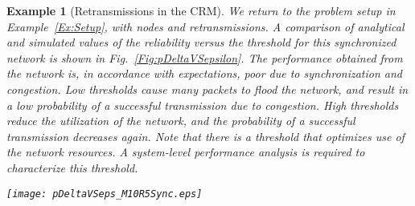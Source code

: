 \documentclass[journal]{IEEEtran}
\newtheorem{example}{Example}[section]
\begin{document}
\begin{example}[Retransmissions in the CRM] \label{Ex:Retx}
We return to the problem setup in Example~\ref{Ex:Setup}, with  nodes and  retransmissions. A comparison of analytical and simulated values of the reliability versus the threshold for this synchronized network is shown in Fig.~\ref{Fig:pDeltaVSepsilon}. The performance obtained from the network is, in accordance with expectations, poor due to synchronization and congestion. Low thresholds cause many packets to flood the network, and result in a low probability of a successful transmission due to congestion. High thresholds reduce the utilization of the network, and the probability of a successful transmission decreases again. Note that there is a threshold that optimizes use of the network resources. A system-level performance analysis is required to characterize this threshold.

\begin{figure*}[tb]
\begin{center}
\texttt{[image: pDeltaVSeps\_M10R5Sync.eps]}
\caption{A comparison of the analytical and simulated values of the reliability versus the scheduler threshold, with retransmissions in the CRM. This example validates Assumption~\ref{Assumption:BianchiMulti}. Note that low thresholds result in a low  due to congestion. High thresholds also result in a low , but due to under-utilization of the network. } \label{Fig:pDeltaVSepsilon}
\end{center}
\end{figure*}
\end{example}
\end{document}
